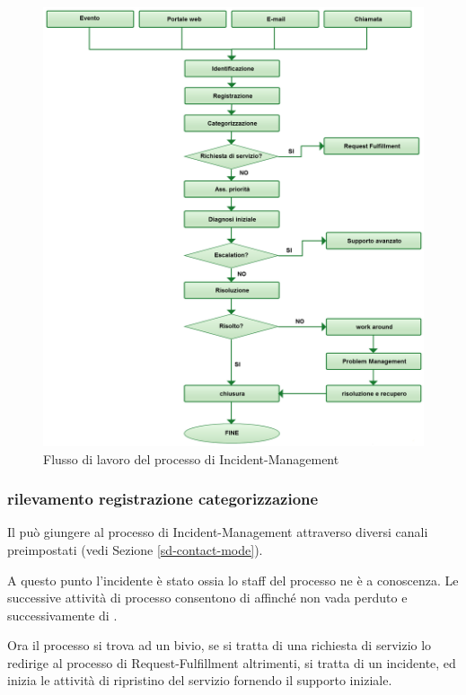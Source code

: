 \begin{figure}[htbp]
\centering
\includegraphics[scale=0.25]{Images/Diagrams/IncidentManagement.png}
\caption{Flusso di lavoro del processo di \ac{Incident-Management}}
\label{prc-incident-activities-img}
\end{figure}

\subsubsection[Rilevamento Registrazione Categorizzazione]{rilevamento registrazione categorizzazione}
Il  può giungere al processo di \ac{Incident-Management} attraverso diversi canali preimpostati (vedi Sezione \ref{sd-contact-mode}).

A questo punto l'incidente è stato  ossia lo staff del processo ne è a conoscenza. Le successive attività di processo consentono di  affinché non vada perduto e successivamente di .

Ora il processo si trova ad un bivio, se si tratta di una richiesta di servizio lo redirige al processo di \ac{Request-Fulfillment} altrimenti, si tratta di un incidente, ed inizia le attività di ripristino del servizio fornendo il supporto iniziale.

